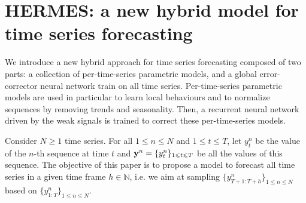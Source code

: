 \documentclass[10pt]{article} %
\newcommand{\ts}{y}
\newcommand{\fullts}{{\bf \ts}}
\newcommand{\lag}{h}
\begin{document}
\begin{table}
  \caption{Fashion time series overview. For each couple geozone/category, the table gives the number of trends (Female/Male).}
\label{tab:fashiondataset}
  \centering
\end{table}


\section{HERMES: a new hybrid model for time series forecasting}
\label{sec:hybrid}
We introduce a new hybrid approach for time series forecasting  composed of two parts: a collection of per-time-series parametric models, and a global error-corrector neural network train on all time series. Per-time-series parametric models are used in particular to learn local behaviours and to normalize sequences by removing trends and seasonality. Then,  a recurrent neural network driven by the weak signals is trained to correct these per-time-series models.

Consider $N\geqslant 1$ time series. For all $1\leqslant n \leqslant N$ and $1\leqslant t \leqslant T$, let $\ts_t^n$ be the value of the $n$-th sequence at time $t$ and  $\fullts^n = \{\ts_t^n\}_{1\leqslant t \leqslant T}$ be all the values of this sequence. The objective of this paper is to propose a model to  forecast all time series in a given time frame  $\lag \in \mathbb{N}$, i.e. we aim at sampling $\{\ts^n_{T+1:T+\lag}\}_{1\leqslant n \leqslant N}$ based on $\{\ts^n_{1:T}\}_{1\leqslant n \leqslant N}$.
\end{document}
